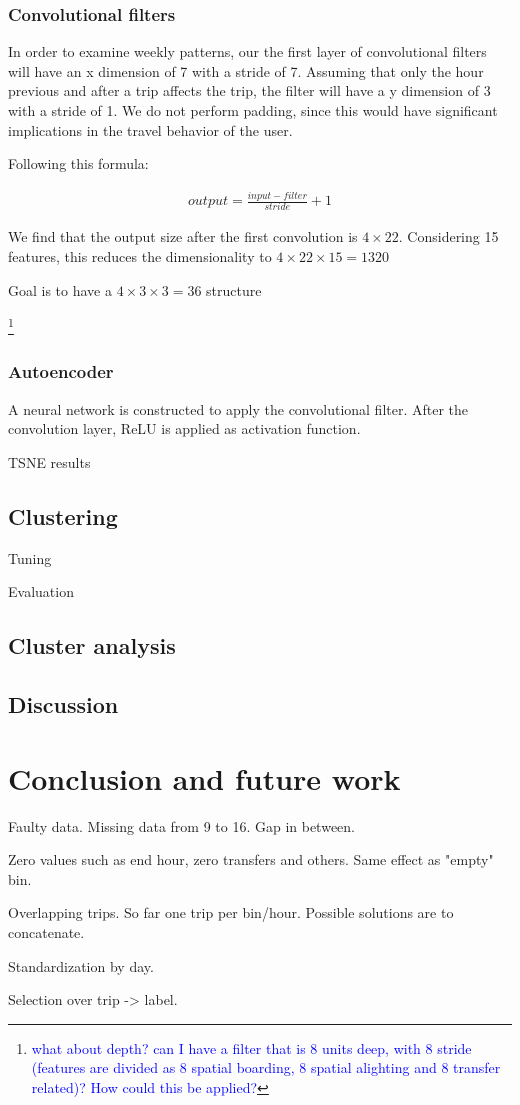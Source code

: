\documentclass{article}
\newcommand{\technicalDoubt}[1]{\footnote{\textcolor{blue}{#1}}}
\begin{document}
\subsubsection{Convolutional filters}
In order to examine weekly patterns, our the first layer of convolutional filters will have an x dimension of 7 with a stride of 7. Assuming that only the hour previous and after a trip affects the trip, the filter will have a y dimension of 3 with a stride of 1. We do not perform padding, since this would have significant implications in the travel behavior of the user. 

Following this formula:

\begin{align*}
	output = \frac{input - filter}{stride} +1
\end{align*}

We find that the output size after the first convolution is $4 \times 22$. Considering 15 features, this reduces the dimensionality to $4 \times 22 \times 15 = 1320$

Goal is to have a $ 4 \times 3 \times 3 = 36$ structure

\technicalDoubt{what about depth? can I have a filter that is 8 units deep, with 8 stride (features are divided as 8 spatial boarding, 8 spatial alighting and 8 transfer related)? How could this be applied?}

\subsubsection{Autoencoder}
A neural network is constructed to apply the convolutional filter. After the convolution layer, ReLU is applied as activation function. 

TSNE results 

\subsection{Clustering}
Tuning

Evaluation

\subsection{Cluster analysis}

\subsection{Discussion}


\newpage
\section{Conclusion and future work}

Faulty data. Missing data from 9 to 16. Gap in between.

Zero values such as end hour, zero transfers and others. Same effect as "empty" bin. 

Overlapping trips. So far one trip per bin/hour. Possible solutions are to concatenate.

Standardization by day.

Selection over trip -> label. 

\newpage
{}

\end{document}
